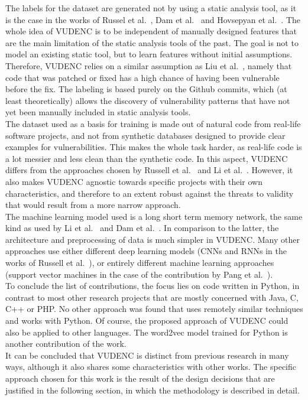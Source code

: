 \documentclass[
a4paper,
pagesize,
pdftex,
12pt,
twoside, %
BCOR=5mm, %
ngerman,
fleqn,
final,
]{scrartcl}
\begin{document}
	The labels for the dataset are generated not by using a static analysis tool, as it is the case in the works of Russel et al.~\cite{Russell.2018}, Dam et al.~\cite{Dam.2017} and Hovsepyan et al.~\cite{Hovsepyan.2012}. The whole idea of VUDENC is to be independent of manually designed features that are the main limitation of the static analysis tools of the past. The goal is not to model an existing static tool, but to learn features without initial assumptions. Therefore, VUDENC relies on a similar assumption as Liu et al.~\cite{Liu.2018}, namely that code that was patched or fixed has a high chance of having been vulnerable before the fix. The labeling is based purely on the Github commits, which (at least theoretically) allows the discovery of vulnerability patterns that have not yet been manually included in static analysis tools.\\
	The dataset used as a basis for training is made out of natural code from real-life software projects, and not from synthetic databases designed to provide clear examples for vulnerabilities. This makes the whole task harder, as real-life code is a lot messier and less clean than the synthetic code. In this aspect, VUDENC differs from the approaches chosen by Russell et al.~\cite{Russell.2018} and Li et al.~\cite{Li.2018}. However, it also makes VUDENC agnostic towards specific projects with their own characteristics, and therefore to an extent robust against the threats to validity that would result from a more narrow approach.\\
	The machine learning model used is a long short term memory network, the same kind as used by Li et al.~\cite{Li.2018} and Dam et al.~\cite{Dam.2017}. In comparison to the latter, the architecture and preprocessing of data is much simpler in VUDENC. Many other approaches use either different deep learning models (CNNs and RNNs in the works of Russell et al.~\cite{Russell.2018}), or entirely different machine learning approaches (support vector machines in the case of the contribution by Pang et al.~\cite{Pang.2015}).\\
	To conclude the list of contributions, the focus lies on code written in Python, in contrast to most other research projects that are mostly concerned with Java, C, C++ or PHP. No other approach was found that uses remotely similar techniques and works with Python. Of course, the proposed approach of VUDENC could also be applied to other languages. The word2vec model trained for Python is another contribution of the work.\\
	It can be concluded that VUDENC is distinct from previous research in many ways, although it also shares some characteristics with other works. The specific approach chosen for this work is the result of the design decisions that are justified in the following section, in which the methodology is described in detail.
	
\end{document}
